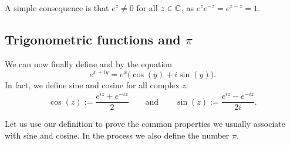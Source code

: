 A simple consequence is that $e^z\not=0$ for all $z \in {\mathbb{C}}$,
as $e^z e^{-z} = e^{z-z} = 1$.

\subsection{Trigonometric functions and $\pi$}

We can now finally define \emph{} and \emph{}
by the equation
\begin{equation*}
e^{x+iy} = e^x \bigl( \cos(y) + i \sin(y) \bigr) .
\end{equation*}
In fact, we define sine and cosine for all complex $z$:
\begin{equation*}
\cos(z) := \frac{e^{iz} + e^{-iz}}{2}
\qquad\text{and}\qquad
\sin(z) := \frac{e^{iz} - e^{-iz}}{2i} .
\end{equation*}

Let us use our definition to prove the common properties we usually
associate with sine and cosine.  In the process we also define the
number $\pi$.

